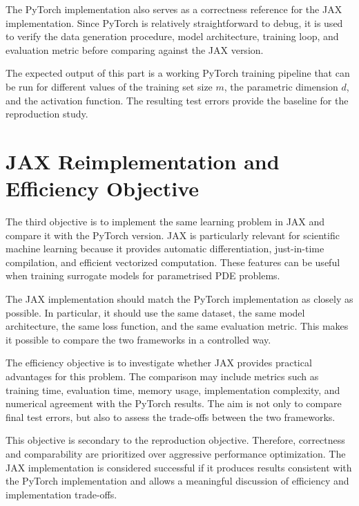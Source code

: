 The PyTorch implementation also serves as a correctness reference for the JAX implementation. Since PyTorch is relatively straightforward to debug, it is used to verify the data generation procedure, model architecture, training loop, and evaluation metric before comparing against the JAX version.

The expected output of this part is a working PyTorch training pipeline that can be run for different values of the training set size $m$, the parametric dimension $d$, and the activation function. The resulting test errors provide the baseline for the reproduction study.

\section{JAX Reimplementation and Efficiency Objective}
The third objective is to implement the same learning problem in JAX and compare it with the PyTorch version. JAX is particularly relevant for scientific machine learning because it provides automatic differentiation, just-in-time compilation, and efficient vectorized computation. These features can be useful when training surrogate models for parametrised PDE problems.

The JAX implementation should match the PyTorch implementation as closely as possible. In particular, it should use the same dataset, the same model
architecture, the same loss function, and the same evaluation metric. This makes it possible to compare the two frameworks in a controlled way.

The efficiency objective is to investigate whether JAX provides practical
advantages for this problem. The comparison may include metrics such as training time, evaluation time, memory usage, implementation complexity, and numerical agreement with the PyTorch results. The aim is not only to compare final test errors, but also to assess the trade-offs between the two frameworks.

This objective is secondary to the reproduction objective. Therefore, correctness and comparability are prioritized over aggressive performance optimization. The JAX implementation is considered successful if it produces results consistent with the PyTorch implementation and allows a meaningful discussion of efficiency and implementation trade-offs.

